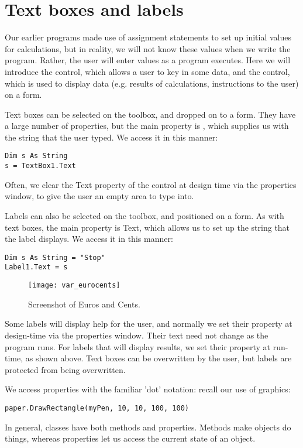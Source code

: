 	\section{Text boxes and labels}
		Our earlier programs made use of assignment statements to set up initial values for calculations, but in reality, we will not know these values when we write the program. Rather, the user will enter values as a program executes. Here we will introduce the  control, which allows a user to key in some data, and the  control, which is used to display data (e.g. results of calculations, instructions to the user) on a form.
		
		Text boxes can be selected on the toolbox, and dropped on to a form. They have a large number of properties, but the main property is , which supplies us with the string that the user typed. We access it in this manner:
		\begin{lstlisting}
Dim s As String
s = TextBox1.Text
		\end{lstlisting}
		Often, we clear the Text property of the control at design time via the properties window, to give the user an empty area to type into.
		
		Labels can also be selected on the toolbox, and positioned on a form. As with text boxes, the main property is Text, which allows us to set up the string that the label displays. We access it in this manner:
		\begin{lstlisting}
Dim s As String = "Stop"
Label1.Text = s
		\end{lstlisting}

		\begin{figure}[ht]
			\centering
			\texttt{[image: var\_eurocents]}
			\caption{Screenshot of Euros and Cents.}
			\label{fig:var_eurocents}
		\end{figure}


		Some labels will display help for the user, and normally we set their  property at design-time via the properties window. Their text need not change as the program runs. For labels that will display results, we set their  property at run-time, as shown above. Text boxes can be overwritten by the user, but labels are protected from being overwritten.
		
		We access properties with the familiar 'dot' notation: recall our use of graphics:
		\begin{lstlisting}
paper.DrawRectangle(myPen, 10, 10, 100, 100)
		\end{lstlisting}
		In general, classes have both methods and properties. Methods make objects do things, whereas properties let us access the current state of an object.
		
